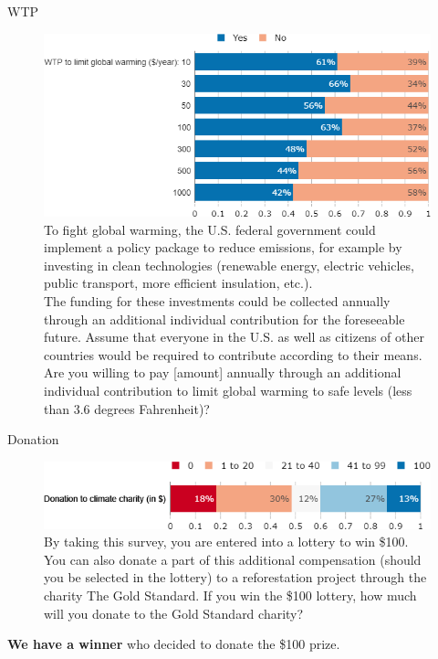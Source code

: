 \documentclass[aspectratio=169,9pt,dvipsnames]{beamer}
\begin{document}
\begin{frame}{WTP}%
\begin{figure}[h!]
\centering
\caption{To fight global warming, the U.S. federal government could implement a policy package to reduce emissions, for example by investing in clean technologies (renewable energy, electric vehicles, public transport, more efficient insulation, etc.). \\
The funding for these investments could be collected annually through an additional individual contribution for the foreseeable future. Assume that everyone in the U.S. as well as citizens of other countries would be required to contribute according to their means. \\ Are you willing to pay [amount] annually through an additional individual contribution to limit global warming to safe levels (less than 3.6 degrees Fahrenheit)?}
\includegraphics[width=.7\textwidth]{../figures/US/wtp_US.png} %
\end{figure}
\end{frame}

\begin{frame}{Donation}
\begin{figure}[h!]
\centering
\caption{By taking this survey, you are entered into a lottery to win \$100. You can also donate a part of this additional compensation (should you be selected in the lottery) to a reforestation project through the charity The Gold Standard. If you win the \$100 lottery, how much will you donate to the Gold Standard charity?}
\includegraphics[width=.9\textwidth]{../figures/US/donation_agg_US.png}
\end{figure}
\textbf{We have a winner} who decided to donate the \$100 prize.
\end{frame}
\end{document}
